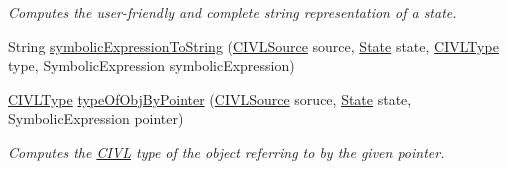 \begin{DoxyCompactItemize}
\begin{DoxyCompactList}\small\item\em Computes the user-\/friendly and complete string representation of a state. \end{DoxyCompactList}\item 
String \hyperlink{interfaceedu_1_1udel_1_1cis_1_1vsl_1_1civl_1_1semantics_1_1IF_1_1SymbolicAnalyzer_aaf6a45bb9d15f4e489fc0dc965faf094}{symbolic\+Expression\+To\+String} (\hyperlink{interfaceedu_1_1udel_1_1cis_1_1vsl_1_1civl_1_1model_1_1IF_1_1CIVLSource}{C\+I\+V\+L\+Source} source, \hyperlink{interfaceedu_1_1udel_1_1cis_1_1vsl_1_1civl_1_1state_1_1IF_1_1State}{State} state, \hyperlink{interfaceedu_1_1udel_1_1cis_1_1vsl_1_1civl_1_1model_1_1IF_1_1type_1_1CIVLType}{C\+I\+V\+L\+Type} type, Symbolic\+Expression symbolic\+Expression)
\item 
\hyperlink{interfaceedu_1_1udel_1_1cis_1_1vsl_1_1civl_1_1model_1_1IF_1_1type_1_1CIVLType}{C\+I\+V\+L\+Type} \hyperlink{interfaceedu_1_1udel_1_1cis_1_1vsl_1_1civl_1_1semantics_1_1IF_1_1SymbolicAnalyzer_a668611f8eddcd2a8f302011cdf6fed6e}{type\+Of\+Obj\+By\+Pointer} (\hyperlink{interfaceedu_1_1udel_1_1cis_1_1vsl_1_1civl_1_1model_1_1IF_1_1CIVLSource}{C\+I\+V\+L\+Source} soruce, \hyperlink{interfaceedu_1_1udel_1_1cis_1_1vsl_1_1civl_1_1state_1_1IF_1_1State}{State} state, Symbolic\+Expression pointer)
\begin{DoxyCompactList}\small\item\em Computes the \hyperlink{classedu_1_1udel_1_1cis_1_1vsl_1_1civl_1_1CIVL}{C\+I\+V\+L} type of the object referring to by the given pointer. \end{DoxyCompactList}\end{DoxyCompactItemize}
{\bf }\par
